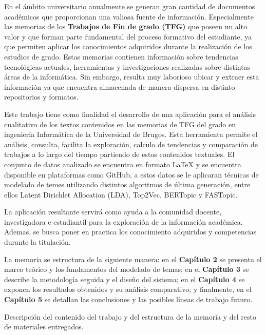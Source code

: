 
En el ámbito universitario anualmente se generan gran cantidad de documentos académicos que proporcionan una valiosa fuente de información. Especialmente las memorias de los \textbf{Trabajos de Fin de grado (TFG)} que poseen un alto valor y que forman parte fundamental del proceso formativo del estudiante, ya que permiten aplicar los conocimientos adquiridos durante la realización de los estudios de grado. Estas memorias contienen información sobre tendencias tecnológicas actuales, herramientas y investigaciones realizadas sobre distintas áreas de la informática. Sin embargo, resulta muy laborioso ubicar y extraer esta información ya que encuentra almacenada de manera dispersa en distinto repositorios y formatos.

Este trabajo tiene como finalidad el desarrollo de una aplicación para el análisis cualitativo de los textos contenidos en las memorias de TFG del grado en ingeniería Informática de la Universidad de Brugos. Esta herramienta permite el análisis, consulta, facilita la exploración, calculo de tendencias y comparación de trabajos a lo largo del tiempo partiendo de estos contenidos textuales.  El conjunto de datos analizado se encuentra en formato LaTeX y se encuentra disponible en plataformas como GitHub, a estos datos se le aplicaran técnicas de modelado de temes utilizando distintos algoritmos de última generación, entre ellos Latent Dirichlet Allocation (LDA), Top2Vec, BERTopic y FASTopic.
 
La aplicación resultante servirá como ayuda a la comunidad docente, investigadora e estudiantil para la exploración de la información académica. Ademas, se busca poner en practica los conocimiento adquiridos y competencias durante la titulación.


La memoria se estructura de la siguiente manera: en el \textbf{Capítulo 2} se presenta el marco teórico y los fundamentos del modelado de temas; en el \textbf{Capítulo 3} se describe la metodología seguida y el diseño del sistema; en el \textbf{Capítulo 4} se exponen los resultados obtenidos y su análisis comparativo; y finalmente, en el \textbf{Capítulo 5} se detallan las conclusiones y las posibles líneas de trabajo futuro.



Descripción del contenido del trabajo y del estructura de la memoria y del resto de materiales entregados.
